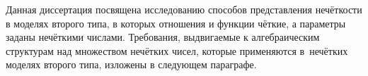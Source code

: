 Данная диссертация посвящена исследованию способов представления нечёткости в моделях второго типа, в которых отношения и функции чёткие, а параметры заданы нечёткими числами. Требования, выдвигаемые к алгебраическим структурам над множеством нечётких чисел, которые применяются в~нечётких моделях второго типа, изложены в следующем параграфе.